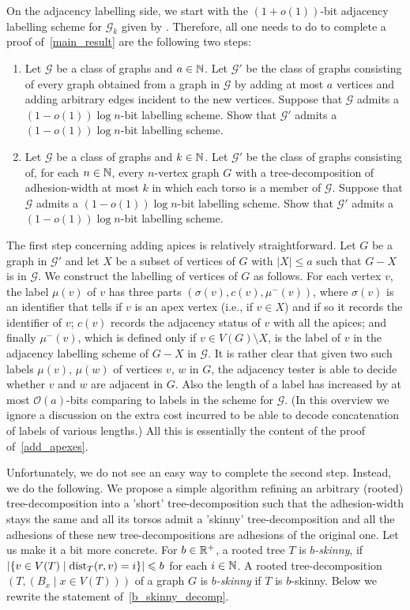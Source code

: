 \documentclass{patmorin}
\renewcommand{\le}{\leqslant}
\renewcommand{\leq}{\leqslant}
\newcommand{\defin}[1]{\emph{\textcolor{brightmaroon}{#1}}}
\DeclareMathOperator{\dist}{dist}
\newcommand{\Oh}{\calO}
\DeclarePairedDelimiter{\set}{\{}{\}}
\newcommand{\calG}{\mathcal{G}}
\newcommand{\calO}{\mathcal{O}}
\begin{document}
On the adjacency labelling side, we start with 
the $(1+o(1))$-bit adjacency labelling scheme for $\calG_k$ given by 
\citet{dujmovic.esperet.ea:adjacency}. 
Therefore, all one needs to do to complete a proof of~\cref{main_result} 
are the following two steps:
\begin{enumerate}[label=\rm(\arabic*)]
\item Let $\calG$ be a class of graphs and $a\in\mathbb{N}$. 
    Let $\calG'$ be the class of graphs consisting of 
    every graph obtained from a graph in $\calG$ 
    by adding at most $a$ vertices and 
    adding arbitrary edges incident to the new vertices.
    Suppose that $\calG$ admits a $(1-o(1))\log n$-bit labelling scheme.
    Show that $\calG'$ admits a $(1-o(1))\log n$-bit labelling scheme.
\item Let $\calG$ be a class of graphs and $k\in\mathbb{N}$. 
      Let $\calG'$ be the class of graphs consisting of, for each $n\in\mathbb{N}$, every $n$-vertex graph $G$ with a tree-decomposition of adhesion-width at most $k$ in which each torso is a member of $\calG$.
      Suppose that $\calG$ admits a $(1-o(1))\log n$-bit labelling scheme.
      Show that $\calG'$ admits a $(1-o(1))\log n$-bit labelling scheme.
\end{enumerate}

The first step concerning adding apices is relatively straightforward. 
Let $G$ be a graph in $\calG'$ and 
let $X$ be a subset of vertices of $G$ with $|X|\leq a$ such that $G-X$ is in $\calG$. 
We construct the labelling of vertices of $G$ as follows. 
For each vertex $v$, 
the label $\mu(v)$ of $v$ has three parts $(\sigma(v),c(v),\mu^-(v))$, 
where $\sigma(v)$ is an identifier that tells if $v$ is an apex vertex (i.e., if $v\in X$) and if so it records the identifier of $v$; 
$c(v)$ records the adjacency status of $v$ with all the apices; and  
finally $\mu^-(v)$, which is defined only if $v\in V(G)\setminus X$, is the label of $v$ in the adjacency labelling scheme of $G-X$ in $\calG$. 
It is rather clear that given two such labels $\mu(v)$, $\mu(w)$ of vertices $v$, $w$ in $G$, the adjacency tester is able to decide whether $v$ and $w$ are adjacent in $G$. 
Also the length of a label has increased by at most $\Oh(a)$-bits comparing to labels in the scheme for $\calG$. 
(In this overview we ignore a discussion on the extra cost incurred to be able to decode concatenation of labels of various lengths.) 
All this is essentially the content of the proof of~\cref{add_apexes}.

Unfortunately, we do not see an easy way to complete the second step. 
Instead, we do the following. 
We propose a simple algorithm refining an arbitrary (rooted) tree-decomposition into 
a 'short' tree-decomposition 
such that the adhesion-width stays the same and
all its torsos admit a 'skinny' tree-decomposition and all the adhesions of these new tree-decompositions are adhesions of the original one. Let us make it a bit more concrete. 
For $b\in\mathbb{R}^+$, a rooted tree $T$ is \defin{$b$-skinny},
  if $|\set{v\in V(T) \mid \dist_T(r,v)=i}|\le b$ for each $i\in\mathbb{N}$.  A rooted tree-decomposition $(T,(B_x\mid x\in V(T)))$ of a graph $G$ is \defin{$b$-skinny} if $T$ is $b$-skinny.  
Below we rewrite the statement of~\cref{b_skinny_decomp}.
\end{document}

